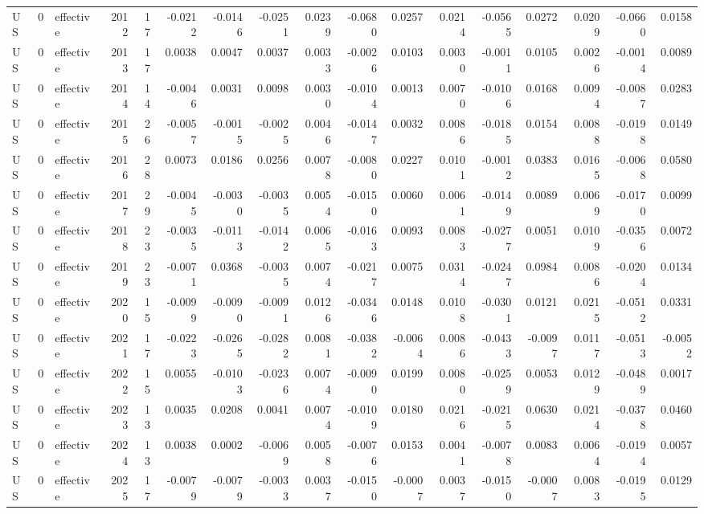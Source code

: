 \begin{tabular}{lrlrrrrrrrrrrrrrr}
US & 0 & effective & 2012 & 17 & -0.0212 & -0.0146 & -0.0251 & 0.0239 & -0.0680 & 0.0257 & 0.0214 & -0.0565 & 0.0272 & 0.0209 & -0.0660 & 0.0158 \\
US & 0 & effective & 2013 & 17 & 0.0038 & 0.0047 & 0.0037 & 0.0033 & -0.0026 & 0.0103 & 0.0030 & -0.0011 & 0.0105 & 0.0026 & -0.0014 & 0.0089 \\
US & 0 & effective & 2014 & 14 & -0.0046 & 0.0031 & 0.0098 & 0.0030 & -0.0104 & 0.0013 & 0.0070 & -0.0106 & 0.0168 & 0.0094 & -0.0087 & 0.0283 \\
US & 0 & effective & 2015 & 26 & -0.0057 & -0.0015 & -0.0025 & 0.0046 & -0.0147 & 0.0032 & 0.0086 & -0.0185 & 0.0154 & 0.0088 & -0.0198 & 0.0149 \\
US & 0 & effective & 2016 & 28 & 0.0073 & 0.0186 & 0.0256 & 0.0078 & -0.0080 & 0.0227 & 0.0101 & -0.0012 & 0.0383 & 0.0165 & -0.0068 & 0.0580 \\
US & 0 & effective & 2017 & 29 & -0.0045 & -0.0030 & -0.0035 & 0.0054 & -0.0150 & 0.0060 & 0.0061 & -0.0149 & 0.0089 & 0.0069 & -0.0170 & 0.0099 \\
US & 0 & effective & 2018 & 23 & -0.0035 & -0.0113 & -0.0142 & 0.0065 & -0.0163 & 0.0093 & 0.0083 & -0.0277 & 0.0051 & 0.0109 & -0.0356 & 0.0072 \\
US & 0 & effective & 2019 & 23 & -0.0071 & 0.0368 & -0.0035 & 0.0074 & -0.0217 & 0.0075 & 0.0314 & -0.0247 & 0.0984 & 0.0086 & -0.0204 & 0.0134 \\
US & 0 & effective & 2020 & 15 & -0.0099 & -0.0090 & -0.0091 & 0.0126 & -0.0346 & 0.0148 & 0.0108 & -0.0301 & 0.0121 & 0.0215 & -0.0512 & 0.0331 \\
US & 0 & effective & 2021 & 17 & -0.0223 & -0.0265 & -0.0282 & 0.0081 & -0.0382 & -0.0064 & 0.0086 & -0.0433 & -0.0097 & 0.0117 & -0.0513 & -0.0052 \\
US & 0 & effective & 2022 & 15 & 0.0055 & -0.0103 & -0.0236 & 0.0074 & -0.0090 & 0.0199 & 0.0080 & -0.0259 & 0.0053 & 0.0129 & -0.0489 & 0.0017 \\
US & 0 & effective & 2023 & 13 & 0.0035 & 0.0208 & 0.0041 & 0.0074 & -0.0109 & 0.0180 & 0.0216 & -0.0215 & 0.0630 & 0.0214 & -0.0378 & 0.0460 \\
US & 0 & effective & 2024 & 13 & 0.0038 & 0.0002 & -0.0069 & 0.0058 & -0.0076 & 0.0153 & 0.0041 & -0.0078 & 0.0083 & 0.0064 & -0.0194 & 0.0057 \\
US & 0 & effective & 2025 & 17 & -0.0079 & -0.0079 & -0.0033 & 0.0037 & -0.0150 & -0.0007 & 0.0037 & -0.0150 & -0.0007 & 0.0083 & -0.0195 & 0.0129 \\

\end{tabular}
